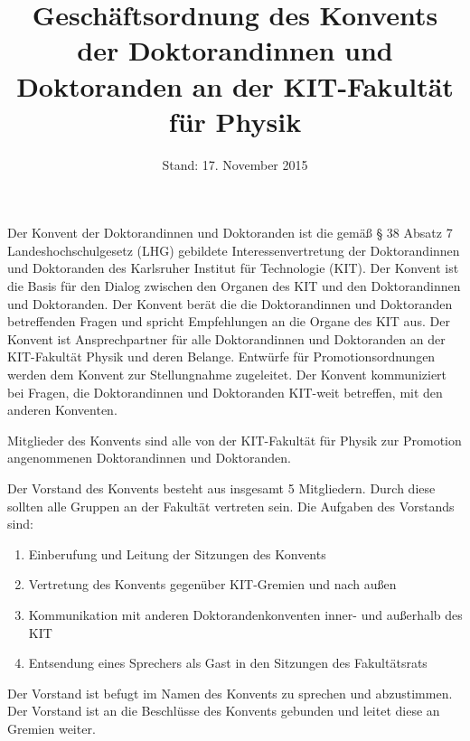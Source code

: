 \documentclass[a4paper, parskip=half, numbers=noenddot]{scrartcl}
\title{Geschäftsordnung des Konvents der Doktorandinnen und Doktoranden an der KIT-Fakultät für Physik}
\date{Stand: 17. November 2015}
\begin{document}
\maketitle



\begin{contract}


\tableofcontents


\label{aufgaben}

Der Konvent der Doktorandinnen und Doktoranden ist die gemäß § 38 Absatz 7
Landeshochschulgesetz (LHG) gebildete Interessenvertretung der Doktorandinnen und
Doktoranden des Karlsruher Institut für Technologie (KIT).
Der Konvent ist die Basis für den Dialog zwischen den Organen des KIT und den Doktorandinnen und Doktoranden.
Der Konvent berät die die Doktorandinnen und Doktoranden betreffenden Fragen und spricht Empfehlungen an die Organe des KIT aus.
Der Konvent ist Ansprechpartner für alle Doktorandinnen und Doktoranden an der KIT-Fakultät Physik und deren Belange.
Entwürfe für Promotionsordnungen werden dem Konvent zur Stellungnahme zugeleitet.
Der Konvent kommuniziert bei Fragen, die Doktorandinnen und Doktoranden KIT-weit betreffen, mit den anderen Konventen.


Mitglieder des Konvents sind alle von der KIT-Fakultät für Physik zur Promotion angenommenen Doktorandinnen und Doktoranden. 


Der Vorstand des Konvents besteht aus insgesamt 5 Mitgliedern. Durch diese sollten alle
Gruppen an der Fakultät vertreten sein.
Die Aufgaben des Vorstands sind:
\begin{enumerate}
	\item Einberufung und Leitung der Sitzungen des Konvents
	\item Vertretung des Konvents gegenüber KIT-Gremien und nach außen
	\item Kommunikation mit anderen Doktorandenkonventen inner- und außerhalb des KIT
	\item Entsendung eines Sprechers als Gast in den Sitzungen des Fakultätsrats
\end{enumerate}
Der Vorstand ist befugt im Namen des Konvents zu sprechen und abzustimmen.
Der Vorstand ist an die Beschlüsse des Konvents gebunden und leitet diese an Gremien weiter.


\end{contract}
\end{document}
